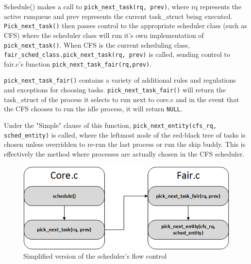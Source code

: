 Schedule() makes a call to \texttt{pick\_next\_task(rq, prev)}, where rq represents the active runqueue and prev represents the current task\_struct being executed. \texttt{Pick\_next\_task()} then passes control to the appropriate scheduler class (such as CFS) where the scheduler class will run it's own implementation of \texttt{pick\_next\_task()}. When CFS is the current scheduling class, \texttt{fair\_sched\_class.pick\_next\_task(rq, prev)} is called, sending control to fair.c's function \texttt{pick\_next\_task\_fair(rq,prev)}.

\texttt{pick\_next\_task\_fair()} contains a variety of additional rules and regulations and exceptions for choosing tasks. \texttt{pick\_next\_task\_fair()} will return the task\_struct of the process it selects to run next to core.c and in the event that the CFS chooses to run the idle process, it will return \texttt{NULL}.

Under the "Simple" clause of this function, \texttt{pick\_next\_entity(cfs\_rq, sched\_entity)} is called, where the leftmost node of the red-black tree of tasks is chosen unless overridden to re-run the last process or run the skip buddy. This is effectively the method where processes are actually chosen in the CFS scheduler.


\begin{figure}[hb]
	\includegraphics[width=1.0\columnwidth]{images/flowcontrol}
	\caption{Simplified version of the scheduler's flow control}
\end{figure}
